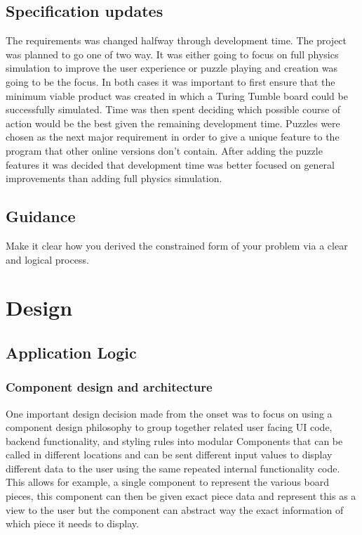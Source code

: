 \documentclass{l4proj}
\begin{document}
\section{Specification updates}
The requirements was changed halfway through development time. The project was planned to go one of two way. It was either going to focus on full physics simulation to improve the user experience or puzzle playing and creation was going to be the focus. In both cases it was important to first ensure that the minimum viable product was created in which a Turing Tumble board could be successfully simulated. Time was then spent deciding which possible course of action would be the best given the remaining development time. Puzzles were chosen as the next major requirement in order to give a unique feature to the program that other online versions don't contain. After adding the puzzle features it was decided that development time was better focused on general improvements than adding full physics simulation. 

\section{Guidance}
Make it clear how you derived the constrained form of your problem via a clear and logical process. 

\chapter{Design}
\section{Application Logic}
\subsection{Component design and architecture}
One important design decision made from the onset was to focus on using a component design philosophy to group together related user facing UI code, backend functionality, and styling rules into modular Components that can be called in different locations and can be sent different input values to display different data to the user using the same repeated internal functionality code. This allows for example, a single component to represent the various board pieces, this component can then be given exact piece data and represent this as a view to the user but the component can abstract way the exact information of which piece it needs to display.
\end{document}
